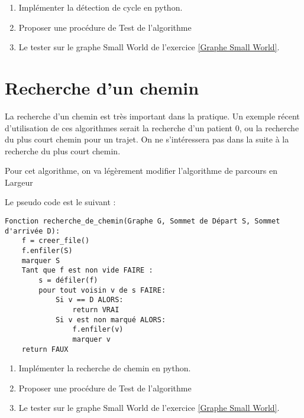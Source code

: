 \documentclass[12pt,fleqn]{article} %
\begin{document}
\begin{exercise}
	\begin{enumerate}
		\item Implémenter la détection de cycle en python.
		\item Proposer une procédure de Test de l'algorithme
		\item Le tester sur le graphe Small World de l'exercice \ref{Graphe Small World}.
	\end{enumerate} 
\end{exercise}


\section{Recherche d'un chemin}

La recherche d'un chemin est très important dans la pratique. Un exemple récent d'utilisation de ces algorithmes serait la recherche d'un patient 0, ou la recherche du plus court chemin pour un trajet. On ne s'intéressera pas dans la suite à la recherche du plus court chemin.

\begin{remark}
	Pour cet algorithme, on va légèrement modifier l'algorithme de parcours en Largeur
\end{remark}

Le pseudo code est le suivant : 

\begin{center}
	\begin{varwidth}[t]{.5\textwidth}
		\begin{lstlisting}[language=Pseudo,linewidth = 12.5cm]
Fonction recherche_de_chemin(Graphe G, Sommet de Départ S, Sommet d'arrivée D):
	f = creer_file()
	f.enfiler(S)
	marquer S
	Tant que f est non vide FAIRE : 
		s = défiler(f)
		pour tout voisin v de s FAIRE:
			Si v == D ALORS:
				return VRAI
			Si v est non marqué ALORS:
				f.enfiler(v)
				marquer v
	return FAUX
		\end{lstlisting}
	\end{varwidth}
\end{center}



\begin{exercise}
	\begin{enumerate}
		\item Implémenter la recherche de chemin en python.
		\item Proposer une procédure de Test de l'algorithme
		\item Le tester sur le graphe Small World de l'exercice \ref{Graphe Small World}.
	\end{enumerate} 
\end{exercise}
\end{document}
